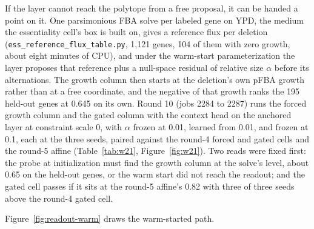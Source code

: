 If the layer cannot reach the polytope from a free proposal, it can be handed a point on
it. One parsimonious FBA solve per labeled gene on YPD, the medium the essentiality cell's
box is built on, gives a reference flux per deletion (\texttt{ess\_reference\_flux\_table.py},
1,121 genes, 104 of them with zero growth, about eight minutes of CPU), and under the
warm-start parameterization the layer proposes that reference plus a null-space residual
of relative size $\alpha$ before its alternations. The growth column then starts at the
deletion's own pFBA growth rather than at a free coordinate, and the negative of that
growth ranks the 195 held-out genes at 0.645 on its own. Round 10 (jobs 2284 to 2287)
runs the forced growth column and the gated column with the context head on the
anchored layer at constraint scale 0, with $\alpha$ frozen at 0.01, learned from 0.01,
and frozen at 0.1, each at the three seeds, paired against the round-4 forced and gated
cells and the round-5 affine (Table~\ref{tab:w21}, Figure~\ref{fig:w21}). Two reads were
fixed first: the probe at initialization must find the growth column at the solve's level,
about 0.65 on the held-out genes, or the warm start did not reach the readout; and the
gated cell passes if it sits at the round-5 affine's 0.82 with three of three seeds above
the round-4 gated cell.

Figure~\ref{fig:readout-warm} draws the warm-started path.





